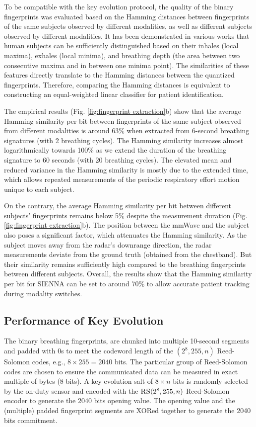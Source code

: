 To be compatible with the key evolution protocol, the quality of the binary fingerprints was evaluated based on the Hamming distances between fingerprints of the same subjects observed by different modalities, as well as different subjects observed by different modalities. It has been demonstrated in various works that human subjects can be sufficiently distinguished based on their inhales (local maxima), exhales (local minima), and breathing depth (the area between two consecutive maxima and in between one minima point). The similarities of these features directly translate to the Hamming distances between the quantized fingerprints. Therefore, comparing the Hamming distances is equivalent to constructing an equal-weighted linear classifier for patient identification.

The empirical results (Fig. \ref{fig:fingerprint extraction}b) show that the average Hamming similarity per bit between fingerprints of the same subject observed from different modalities is around 63\% when extracted from 6-second breathing signatures (with 2 breathing cycles). The Hamming similarity increases almost logarithmically towards 100\% as we extend the duration of the breathing signature to 60 seconds (with 20 breathing cycles). The elevated mean and reduced variance in the Hamming similarity is mostly due to the extended time, which allows repeated measurements of the periodic respiratory effort motion unique to each subject. 

On the contrary, the average Hamming similarity per bit between different subjects' fingerprints remains below 5\% despite the measurement duration (Fig. \ref{fig:fingerprint extraction}b). The position between the mmWave and the subject also poses a significant factor, which attenuates the Hamming similarity. As the subject moves away from the radar's downrange direction, the radar measurements deviate from the ground truth (obtained from the chestband). But their similarity remains sufficiently high compared to the breathing fingerprints between different subjects. Overall, the results show that the Hamming similarity per bit for SIENNA can be set to around 70\% to allow accurate patient tracking during modality switches.

\subsection{Performance of Key Evolution}
The binary breathing fingerprints, are chunked into multiple 10-second segments and padded with 0s to meet the codeword length of the $(2^{8}, 255, n)$ Reed-Solomon codes, e.g., $8 \times 255 = 2040$ bits. The particular group of Reed-Solomon codes are chosen to ensure the communicated data can be measured in exact multiple of bytes (8 bits). A key evolution salt of $8 \times n$ bits is randomly selected by the on-duty sensor and encoded with the $\textsc{RS}(2^{8}, 255, n)$ Reed-Solomon encoder to generate the 2040 bits opening value. The opening value and the (multiple) padded fingerprint segments are XORed together to generate the 2040 bits commitment.

